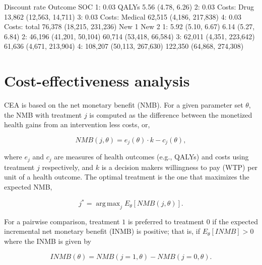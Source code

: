 \documentclass[article, nojss]{jss}\usepackage[]{graphicx}\usepackage[]{color}
\DeclareMathOperator*{\argmax}{arg\,max}
\begin{document}
\begin{Schunk}
\begin{Soutput}
   Discount rate        Outcome                      SOC
1:          0.03          QALYs        5.56 (4.78, 6.26)
2:          0.03    Costs: Drug  13,862 (12,563, 14,711)
3:          0.03 Costs: Medical  62,515 (4,186, 217,838)
4:          0.03   Costs: total 76,378 (18,215, 231,236)
                       New 1                     New 2
1:         5.92 (5.10, 6.67)         6.14 (5.27, 6.84)
2:   46,196 (41,201, 50,104)   60,714 (53,418, 66,584)
3:   62,011 (4,351, 223,642)   61,636 (4,671, 213,904)
4: 108,207 (50,113, 267,630) 122,350 (64,868, 274,308)
\end{Soutput}
\end{Schunk}

\section{Cost-effectiveness analysis} \label{sec:cea}
CEA is based on the net monetary benefit (NMB). For a given parameter set $\theta$, the NMB with treatment $j$ is computed as the difference between the monetized health gains from an intervention less costs, or,

\begin{equation}
NMB(j,\theta) = e_{j}(\theta)\cdot k- c_{j}(\theta),
\end{equation}

where $e_{j}$ and $c_{j}$ are measures of health outcomes (e.g., QALYs) and costs using treatment $j$ respectively, and $k$ is a decision makers willingness to pay (WTP) per unit of a health outcome. The optimal treatment is the one that maximizes the expected NMB,

\begin{equation}
j^{*} = \argmax_j E_{\theta} \left[NMB(j,\theta)\right].
\end{equation}

For a pairwise comparison, treatment $1$ is preferred to treatment $0$ if the expected incremental net monetary benefit (INMB) is positive; that is, if $E_\theta {} > 0$ where the INMB is given by

\begin{equation}
INMB(\theta) = NMB(j = 1, \theta) - NMB(j = 0, \theta).
\end{equation}
\end{document}

